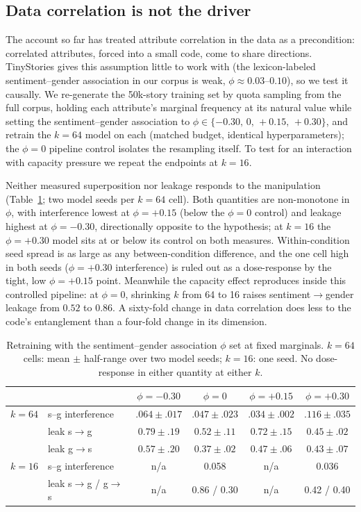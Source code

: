 \documentclass[11pt]{article}
\begin{document}
\subsection{Data correlation is not the driver}
\label{sec:rho}
The account so far has treated attribute correlation in the data as a precondition:
correlated attributes, forced into a small code, come to share directions. TinyStories
gives this assumption little to work with (the lexicon-labeled sentiment--gender
association in our corpus is weak, $\phi\approx0.03$--$0.10$), so we test it
causally. We re-generate the 50k-story training set by quota sampling from the full
corpus, holding each attribute's marginal frequency at its natural value while
setting the sentiment--gender association to
$\phi\in\{-0.30,\,0,\,+0.15,\,+0.30\}$, and retrain the $k{=}64$ model on each
(matched budget, identical hyperparameters); the $\phi{=}0$ pipeline control isolates
the resampling itself. To test for an interaction with capacity pressure we repeat
the endpoints at $k{=}16$.

Neither measured superposition nor leakage responds to the manipulation
(Table~\ref{tab:rho}; two model seeds per $k{=}64$ cell). Both quantities are
non-monotone in $\phi$, with interference lowest at $\phi{=}+0.15$ (below the
$\phi{=}0$ control) and leakage highest at $\phi{=}-0.30$, directionally opposite to
the hypothesis; at $k{=}16$ the $\phi{=}+0.30$ model sits at or below its control on
both measures. Within-condition seed spread is as large as any between-condition
difference, and the one cell high in both seeds ($\phi{=}+0.30$ interference) is
ruled out as a dose-response by the tight, low $\phi{=}+0.15$ point. Meanwhile the
capacity effect reproduces inside this controlled pipeline: at $\phi{=}0$, shrinking
$k$ from 64 to 16 raises sentiment$\to$gender leakage from $0.52$ to $0.86$. A
sixty-fold change in data correlation does less to the code's entanglement than a
four-fold change in its dimension.

\begin{table}[h]\centering\small
\begin{tabular}{ll cccc}
& & $\phi{=}-0.30$ & $\phi{=}0$ & $\phi{=}+0.15$ & $\phi{=}+0.30$ \\
\hline
$k{=}64$ & s--g interference        & $.064\!\pm\!.017$ & $.047\!\pm\!.023$ & $.034\!\pm\!.002$ & $.116\!\pm\!.035$ \\
         & leak s$\to$g             & $0.79\!\pm\!.19$ & $0.52\!\pm\!.11$ & $0.72\!\pm\!.15$ & $0.45\!\pm\!.02$ \\
         & leak g$\to$s             & $0.57\!\pm\!.20$ & $0.37\!\pm\!.02$ & $0.47\!\pm\!.06$ & $0.43\!\pm\!.07$ \\
\hline
$k{=}16$ & s--g interference        & n/a & 0.058 & n/a & 0.036 \\
         & leak s$\to$g / g$\to$s   & n/a & 0.86 / 0.30 & n/a & 0.42 / 0.40 \\
\end{tabular}
\caption{Retraining with the sentiment--gender association $\phi$ set at fixed
marginals. $k{=}64$ cells: mean $\pm$ half-range over two model seeds; $k{=}16$: one
seed. No dose-response in either quantity at either $k$.}
\label{tab:rho}
\end{table}
\end{document}
